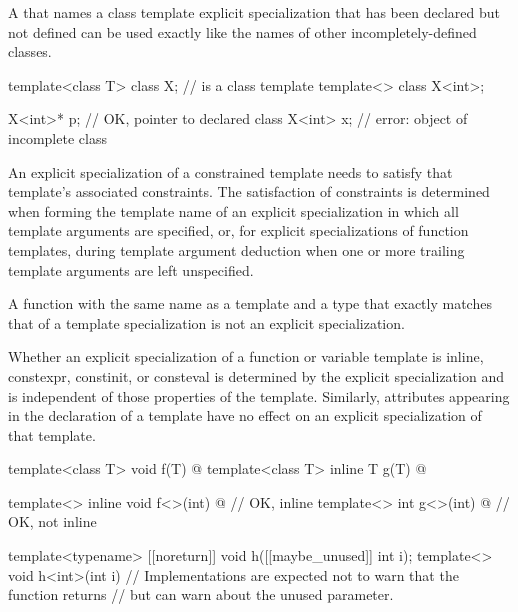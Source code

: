 \pnum
A
that names a class template explicit specialization that has been declared but
not defined can be used exactly like the names of other incompletely-defined
classes.
\begin{example}
\begin{codeblock}
template<class T> class X;                      //  is a class template
template<> class X<int>;

X<int>* p;                                      // OK, pointer to declared class 
X<int> x;                                       // error: object of incomplete class 
\end{codeblock}
\end{example}

\pnum
\begin{note}
An explicit specialization of a constrained template needs
to satisfy that template's associated constraints.
The satisfaction of constraints is determined
when forming the template name of an explicit specialization
in which all template arguments are specified,
or, for explicit specializations of function templates,
during template argument deduction
when one or more trailing template arguments are left unspecified.
\end{note}

\pnum
A function with the same name as a template and a type that exactly matches that
of a template specialization is not an explicit specialization.

\pnum
Whether an explicit specialization of a function or variable template
is inline, constexpr, constinit, or consteval
is determined by the explicit specialization and
is independent of those properties of the template.
Similarly,
attributes appearing in the declaration of a template
have no effect on an explicit specialization of that template.
\begin{example}
\begin{codeblock}
template<class T> void f(T) { @\commentellip@ }
template<class T> inline T g(T) { @\commentellip@ }

template<> inline void f<>(int) { @\commentellip@ }   // OK, inline
template<> int g<>(int) { @\commentellip@ }           // OK, not inline

template<typename> [[noreturn]] void h([[maybe_unused]] int i);
template<> void h<int>(int i) {
    // Implementations are expected not to warn that the function returns
    // but can warn about the unused parameter.
}
\end{codeblock}
\end{example}

